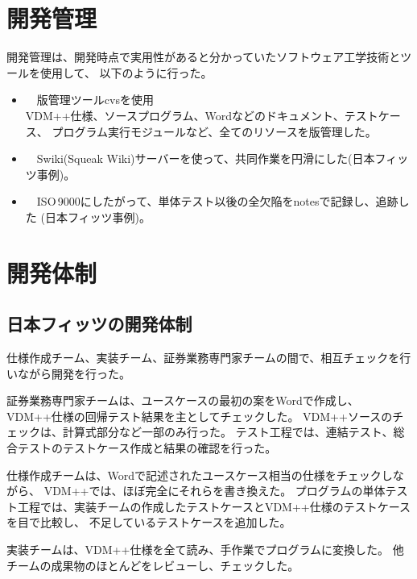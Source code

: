 \section{開発管理}
	\label{DevelopmentManagement}

	開発管理は、開発時点で実用性があると分かっていたソフトウェア工学技術とツールを使用して、
	以下のように行った。

	\begin{itemize}
	\item　版管理ツールcvsを使用 \\
			VDM++仕様、ソースプログラム、Wordなどのドキュメント、テストケース、
			プログラム実行モジュールなど、全てのリソースを版管理した。
	\item　Swiki(Squeak Wiki)サーバーを使って、共同作業を円滑にした(日本フィッツ事例)。
	\item　ISO\,9000にしたがって、単体テスト以後の全欠陥をnotesで記録し、追跡した (日本フィッツ事例)。
	\end{itemize} 

\section{開発体制}
	\label{DevelopmentTeamStructure}

\subsection{日本フィッツの開発体制}

	仕様作成チーム、実装チーム、証券業務専門家チームの間で、相互チェックを行いながら開発を行った。

	証券業務専門家チームは、ユースケースの最初の案をWordで作成し、VDM++仕様の回帰テスト結果を主としてチェックした。
	VDM++ソースのチェックは、計算式部分など一部のみ行った。
	テスト工程では、連結テスト、総合テストのテストケース作成と結果の確認を行った。

	仕様作成チームは、Wordで記述されたユースケース相当の仕様をチェックしながら、
	VDM++では、ほぼ完全にそれらを書き換えた。
	プログラムの単体テスト工程では、実装チームの作成したテストケースとVDM++仕様のテストケースを目で比較し、
	不足しているテストケースを追加した。

	実装チームは、VDM++仕様を全て読み、手作業でプログラムに変換した。
	他チームの成果物のほとんどをレビューし、チェックした。
	

